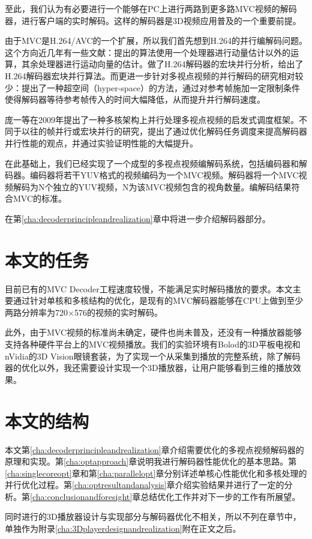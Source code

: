 至此，我们认为有必要进行一个能够在PC上进行两路到更多路MVC视频的解码器，进行客户端的实时解码。这样的解码器是3D视频应用普及的一个重要前提。

由于MVC是H.264/AVC的一个扩展，所以我们首先想到H.264的并行编解码问题。这个方向近几年有一些文献：提出的算法使用一个处理器进行动量估计以外的运算，其余处理器进行运动向量的估计。做了H.264解码器的宏块并行分析，给出了H.264解码器宏块并行算法。而更进一步针对多视点视频的并行解码的研究相对较少：提出了一种超空间（hyper-space）的方法，通过对参考帧施加一定限制条件使得解码器等待参考帧传入的时间大幅降低，从而提升并行解码速度。

庞一等在2009年提出了一种多核架构上并行处理多视点视频的启发式调度框架\cite{pang2009framework}。不同于以往的帧并行或宏块并行的研究，提出了通过优化解码任务调度来提高解码器并行性能的观点，并通过实验证明性能的大幅提升。

在此基础上，我们已经实现了一个成型的多视点视频编解码系统，包括编码器和解码器。编码器将若干YUV格式的视频编码为一个MVC视频。解码器将一个MVC视频解码为N个独立的YUV视频，N为该MVC视频包含的视角数量。编解码结果符合MVC的标准\cite{iso2009mvc}。

在第\ref{cha:decoderprincipleandrealization}章中将进一步介绍解码器部分。

\section{本文的任务}
\label{sec:workbrief}

目前已有的MVC Decoder工程速度较慢，不能满足实时解码播放的要求。本文主要通过针对单核和多核结构的优化，是现有的MVC解码器能够在CPU上做到至少两路分辨率为720$\times$576的视频的实时解码。

此外，由于MVC视频的标准尚未确定，硬件也尚未普及，还没有一种播放器能够支持各种硬件平台上的MVC视频播放。我们的实验环境有Bolod的3D平板电视和nVidia的3D Vision眼镜套装，为了实现一个从采集到播放的完整系统，除了解码器的优化以外，我还需要设计实现一个3D播放器，让用户能够看到三维的播放效果。

\section{本文的结构}
\label{sec:thesisstructure}

本文第\ref{cha:decoderprincipleandrealization}章介绍需要优化的多视点视频解码器的原理和实现。第\ref{cha:optapproach}章说明我进行解码器性能优化的基本思路。第\ref{cha:singlecoreopt}章和第\ref{cha:parallelopt}章分别详述单核心性能优化和多核处理的并行优化过程。第\ref{cha:optresultandanalysis}章介绍实验结果并进行了一定的分析。第\ref{cha:conclusionandforesight}章总结优化工作并对下一步的工作有所展望。

同时进行的3D播放器设计与实现部分与解码器优化不相关，所以不列在章节中，单独作为附录\ref{cha:3Dplayerdesignandrealization}附在正文之后。